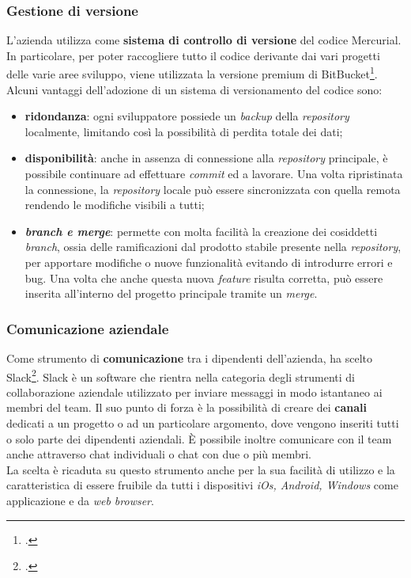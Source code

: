 \subsubsection{Gestione di versione}
L'azienda \azienda{} utilizza come \textbf{sistema di controllo di versione} del codice \gls{Mercurial}. In particolare, per
poter raccogliere tutto il codice derivante dai vari progetti delle varie aree sviluppo, viene utilizzata la versione premium di BitBucket\footcite{bit}.\\

Alcuni vantaggi dell'adozione di un sistema di versionamento del codice sono:
\begin{itemize}
	\item \textbf{ridondanza}: ogni sviluppatore possiede un \emph{backup} della \emph{repository} localmente, limitando così la possibilità di perdita totale dei dati;
	\item \textbf{disponibilità}: anche in assenza di connessione alla \emph{repository} principale, è possibile continuare ad effettuare \emph{commit} ed a lavorare. Una volta ripristinata
la connessione, la \emph{repository} locale può essere sincronizzata con quella remota
rendendo le modifiche visibili a tutti;
	\item \textbf{\emph{branch e merge}}: permette con molta facilità la creazione dei cosiddetti \emph{branch}, ossia delle ramificazioni dal prodotto stabile presente nella \emph{repository}, per apportare modifiche o nuove funzionalità evitando di introdurre errori e bug. Una volta che anche questa nuova \emph{feature} risulta corretta, può essere inserita all'interno del progetto principale tramite un \emph{merge}.
\end{itemize}
\subsubsection{Comunicazione aziendale}
Come strumento di \textbf{comunicazione} tra i dipendenti dell'azienda, \azienda{} ha scelto Slack\footcite{slack}.
Slack è un software che rientra nella categoria degli strumenti di collaborazione aziendale utilizzato per inviare messaggi in modo istantaneo ai membri del team. Il suo punto di forza è la possibilità di creare dei \textbf{canali} dedicati a un progetto o ad un particolare argomento, dove vengono inseriti tutti o solo parte dei dipendenti aziendali. È possibile inoltre comunicare con il team anche attraverso chat individuali o chat con due o più membri.\\
La scelta è ricaduta su questo strumento anche per la sua facilità di utilizzo e la caratteristica di essere fruibile da tutti i dispositivi \emph{iOs, Android, Windows} come applicazione e da \emph{web browser}.

